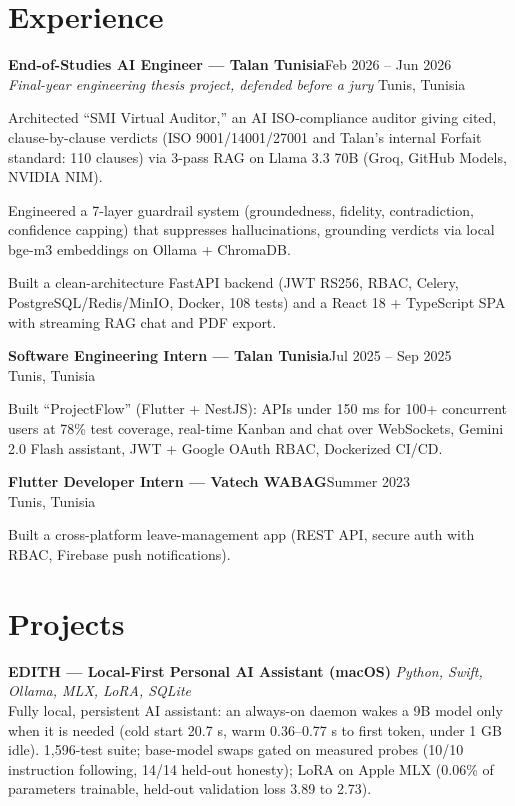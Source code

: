 \documentclass[a4paper,10pt]{article}
\newcommand{\entry}[4]{%
  \vspace{2pt}%
  {\bfseries #1}\hfill{\small #2}\\[1pt]%
  {\small\itshape\color{muted} #3}\hfill{\small\color{muted} #4}%
}
\newcommand{\project}[3]{%
  \vspace{2pt}%
  {\bfseries #1}\hfill{\small\itshape\color{muted} #2}\\[1pt]%
  {\small #3}%
}
\begin{document}
\section{Experience}

\entry{End-of-Studies AI Engineer --- Talan Tunisia}{Feb 2026 -- Jun 2026}{Final-year engineering thesis project, defended before a jury}{Tunis, Tunisia}
\begin{bullets}
  \item Architected ``SMI Virtual Auditor,'' an AI ISO-compliance auditor giving cited, clause-by-clause verdicts (ISO 9001/14001/27001 and Talan's internal Forfait standard: 110 clauses) via 3-pass RAG on Llama 3.3 70B (Groq, GitHub Models, NVIDIA NIM).
  \item Engineered a 7-layer guardrail system (groundedness, fidelity, contradiction, confidence capping) that suppresses hallucinations, grounding verdicts via local bge-m3 embeddings on Ollama + ChromaDB.
  \item Built a clean-architecture FastAPI backend (JWT RS256, RBAC, Celery, PostgreSQL/Redis/MinIO, Docker, 108 tests) and a React 18 + TypeScript SPA with streaming RAG chat and PDF export.
\end{bullets}

\entry{Software Engineering Intern --- Talan Tunisia}{Jul 2025 -- Sep 2025}{}{Tunis, Tunisia}
\begin{bullets}
  \item Built ``ProjectFlow'' (Flutter + NestJS): APIs under 150 ms for 100+ concurrent users at 78\% test coverage, real-time Kanban and chat over WebSockets, Gemini 2.0 Flash assistant, JWT + Google OAuth RBAC, Dockerized CI/CD.
\end{bullets}

\entry{Flutter Developer Intern --- Vatech WABAG}{Summer 2023}{}{Tunis, Tunisia}
\begin{bullets}
  \item Built a cross-platform leave-management app (REST API, secure auth with RBAC, Firebase push notifications).
\end{bullets}

\section{Projects}

\project{EDITH --- Local-First Personal AI Assistant (macOS)}{Python, Swift, Ollama, MLX, LoRA, SQLite}{Fully local, persistent AI assistant: an always-on daemon wakes a 9B model only when it is needed (cold start 20.7 s, warm 0.36--0.77 s to first token, under 1 GB idle). 1,596-test suite; base-model swaps gated on measured probes (10/10 instruction following, 14/14 held-out honesty); LoRA on Apple MLX (0.06\% of parameters trainable, held-out validation loss 3.89 to 2.73).}
\end{document}

